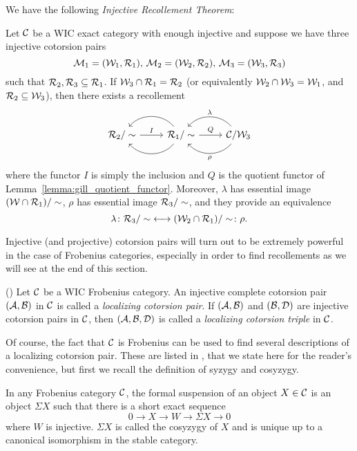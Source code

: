 We have the following \emph{Injective Recollement Theorem}:

\begin{thm}{\cite[Theorem~3.4]{G7}}\label{thm:gil_inj_recoll}
  Let $\mathcal{C}$ be a WIC exact category with enough injective and suppose we have three injective cotorsion pairs
  \[
    \mathcal{M}_1=(\mathcal{W}_1,\mathcal{R}_1)\text{, }\mathcal{M}_2=(\mathcal{W}_2,\mathcal{R}_2)\text{, }\mathcal{M}_3=(\mathcal{W}_3,\mathcal{R}_3)
  \]
  such that $\mathcal{R}_2,\mathcal{R}_3\subseteq \mathcal{R}_1$. If $\mathcal{W}_3\cap\mathcal{R}_1=\mathcal{R}_2$ (or equivalently $\mathcal{W}_2\cap\mathcal{W}_3=\mathcal{W}_1$, and $\mathcal{R}_2\subseteq \mathcal{W}_3$), then there exists a recollement
  \begin{equation*}
    \begin{tikzcd}
      {\R_2/\sim}\arrow{r}{I}
      & {\R_1/\sim}\arrow[bend left=50]{l}\arrow[bend right=50]{l}\arrow{r}{Q}
      & \C/\W_3\arrow[bend left=50]{l}{\rho}\arrow[bend right=50]{l}[']{\lambda}
    \end{tikzcd}
  \end{equation*}
  where the functor $I$ is simply the inclusion and $Q$ is the quotient functor of Lemma~\ref{lemma:gill_quotient_functor}. Moreover, $\lambda$ has essential image $(\mathcal{W}\cap\mathcal{R}_1)/\sim$, $\rho$ has essential image ${\mathcal{R}_3/\sim}$, and they provide an equivalence \[\lambda\colon{\mathcal{R}_3/\sim} \longleftrightarrow (\mathcal{W}_2\cap\mathcal{R}_1)/\sim\colon\rho.\]
\end{thm}

Injective (and projective) cotorsion pairs will turn out to be extremely powerful in the case of Frobenius categories, especially in order to find recollements as we will see at the end of this section.

\begin{defn} (\cite[Definition 4.3]{G7}) Let $\mathcal{C}$ be a WIC Frobenius category.
An injective complete cotorsion pair $(\mathcal{A}, \mathcal{B})$ in $\mathcal{C}$ is called a \emph{localizing cotorsion pair}. If $(\mathcal{A}, \mathcal{B})$ and $(\mathcal{B}, \mathcal{D})$ are injective cotorsion pairs in $\mathcal{C}$, then $(\mathcal{A}, \mathcal{B}, \mathcal{D})$ is called a \emph{localizing cotorsion triple} in $\mathcal{C}$.
\end{defn}

Of course, the fact that $\mathcal{C}$ is Frobenius can be used to find several descriptions of a localizing cotorsion pair. These are listed in \cite[Proposition 4.2]{G7}, that we state here for the reader's convenience, but first we recall the definition of syzygy and cosyzygy.

\begin{defn}
  In any Frobenius category $\mathcal{C}$, the formal suspension of an object $X\in\mathcal{C}$ is an object $\Sigma X$ such that there is a short exact sequence
  \[ 0\to X\to W\to \Sigma X\to 0 \]
  where $W$ is injective. $\Sigma X$ is called the cosyzygy of $X$ and is unique up to a canonical isomorphism in the stable category.
\end{defn}

